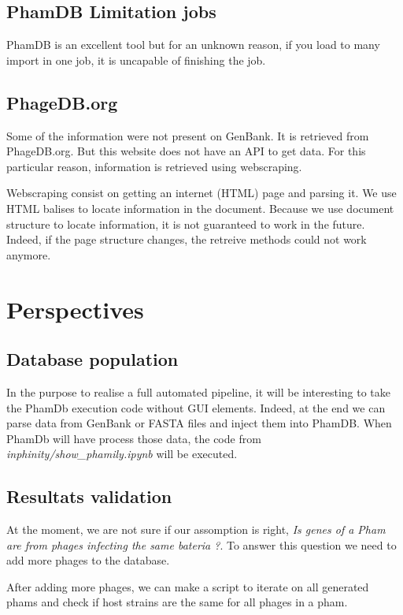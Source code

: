 \documentclass[a4paper,11pt]{report}
\begin{document}
\subsection{PhamDB Limitation jobs}
PhamDB is an excellent tool but for an unknown reason, if you load to many import in one job, it is uncapable of finishing the job.

\subsection{PhageDB.org}
Some of the information were not present on GenBank. It is retrieved from PhageDB.org. But this website does not have an API to get data. For this particular reason, information is retrieved using webscraping.

Webscraping consist on getting an internet (HTML) page and parsing it. We use HTML balises to locate information in the document. Because we use document structure to locate information, it is not guaranteed to work in the future. Indeed, if the page structure changes, the retreive methods could not work anymore.

\section{Perspectives}
\subsection{Database population}

In the purpose to realise a full automated pipeline, it will be interesting to take the PhamDb execution code without GUI elements. Indeed, at the end we can parse data from GenBank or FASTA files and inject them into PhamDB. When PhamDb will have process those data, the code from \textit{inphinity/show\_phamily.ipynb} will be executed.

\subsection{Resultats validation}

At the moment, we are not sure if our assomption is right, \textit{Is genes of a Pham are from phages infecting the same bateria ?}. To answer this question we need to add more phages to the database.

After adding more phages, we can make a script to iterate on all generated phams and check if host strains are the same for all phages in a pham.
\end{document}
